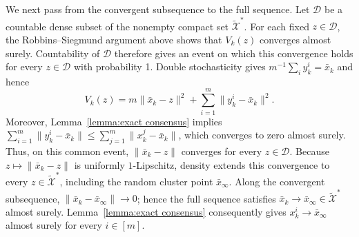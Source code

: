 \documentclass[twocolumn]{autart}    %
\newcommand{\1}{\mathbf{1}}
\begin{document}
We next pass from the convergent subsequence to the full sequence. Let $\mathcal D$ be a countable dense subset of the nonempty compact set $\widetilde{\mathcal X}^{\ast}$. For each fixed $z\in\mathcal D$, the Robbins--Siegmund argument above shows that $V_k(z)$ converges almost surely. Countability of $\mathcal D$ therefore gives an event on which this convergence holds for every $z\in\mathcal D$ with probability 1. 
 Double stochasticity gives
$m^{-1}\sum_i y_k^i=\bar x_k$ and hence
\begin{equation*}
V_k(z)=m\|\bar x_k-z\|^2
+\sum_{i=1}^m\|y_k^i-\bar x_k\|^2.
\end{equation*}
Moreover, Lemma~\ref{lemma:exact consensus} implies 
$\sum_{i=1}^m\|y_k^i-\bar x_k\|
\leq\sum_{j=1}^m\|x_k^j-\bar x_k\|$, 
which converges to zero almost surely.   
Thus, on this common event, $\|\bar x_k-z\|$ converges for every $z\in\mathcal D$. Because $z\mapsto\|\bar x_k-z\|$ is uniformly $1$-Lipschitz, density extends this convergence to every $z\in\widetilde{\mathcal X}^{\ast}$, including the random cluster point $\bar x_\infty$. Along the convergent subsequence, $\|\bar x_k-\bar x_\infty\|\to0$; hence the full sequence satisfies $\bar x_k\to\bar x_\infty\in\widetilde{\mathcal X}^{\ast}$ almost surely.
Lemma~\ref{lemma:exact consensus} consequently gives
$x_k^i\to\bar x_\infty$ almost surely for every $i\in[m]$.
\end{document}
